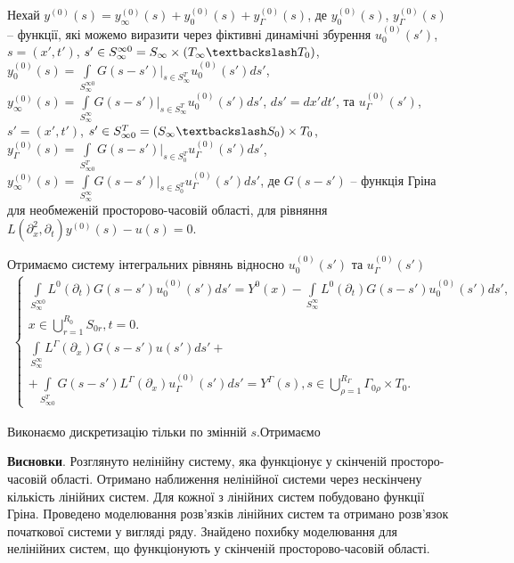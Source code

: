 Нехай $y^{(0)}(s) = y^{(0)}_{\infty}(s) + y^{(0)}_{0}(s) + y^{(0)}_{\Gamma}(s)$, де $y^{(0)}_{0}(s)$, $y^{(0)}_{\Gamma}(s)$ --
функції, які можемо виразити через фіктивні динамічні збурення
$u^{(0)}_{0}(s')$,
$s=(x', t')$,
$s'\in S_{\infty}^{\infty 0} = S_{\infty} \times (T_{\infty}\textbackslash T_{0})$,
$y_{0}^{(0)}(s)=\int\limits_{S_{\infty}^{\infty 0}}G(s-s')\bigg|_{s\in S_{\infty}^{T}}u_{0}^{(0)}(s')ds'$,
$y_{\infty}^{(0)}(s)=\int\limits_{S_{\infty}^{\infty}}G(s-s')\bigg|_{s\in S_{\infty}^{T}}u_{0}^{(0)}(s')ds'$,
$ds'=dx'dt'$,
та
$u^{(0)}_{\Gamma}(s')$, $s'=(x', t')$, $s'\in S^{T}_{\infty 0}=(S_{\infty} \textbackslash S_{0})\times T_{0}$,
$y^{(0)}_{\Gamma}(s) = \int\limits_{S^{T}_{\infty 0}}G(s-s')\bigg|_{s\in S^{T}_{0}}u^{(0)}_{\Gamma}(s')ds'$,
$y^{(0)}_{\infty}(s) = \int\limits_{S^{\infty}_{\infty}}G(s-s')\bigg|_{s\in S^{T}_{0}}u^{(0)}_{\Gamma}(s')ds'$,
де $G(s - s')$ -- функція Гріна для необмеженій просторово-часовій області, для рівняння $L(\partial_x^2, \partial_t)y^{(0)}(s) - u(s) = 0$.

Отримаємо систему інтегральних рівнянь відносно $u^{(0)}_{0}(s')$ та $u^{(0)}_{\Gamma}(s')$
\begin{gather*}
    \left\{
    \begin{alignedat}{2}
        \int\limits_{S_{\infty}^{\infty 0}}L^{0}(\partial_{t})G(s-s')u_{0}^{(0)}(s')ds' =
        Y^{0}(x)-\int\limits_{S_{\infty}^{\infty}} L^{0}(\partial_{t})G(s-s')u_{0}^{(0)}(s')ds',\\
        x\in\bigcup\limits_{r=1}^{R_{0}} S_{0r},t=0.\\
        \int\limits_{S^{\infty}_{\infty}}L^{\Gamma}(\partial_{x})G(s-s')u(s')ds' +\\
        + \int\limits_{S^{T}_{\infty 0}}G(s-s')L^{\Gamma}(\partial_{x})u^{(0)}_{\Gamma}(s')ds' = Y^{\Gamma}(s),
        s\in\bigcup\limits_{\rho=1}^{R_{\Gamma}} \Gamma_{0\rho}\times T_{0}.
    \end{alignedat}
    \right.
\end{gather*}



Виконаємо дискретизацію тільки по змінній $s$.Отримаємо











\textbf{Висновки}.
Розглянуто нелінійну систему, яка функціонує у скінченій просторо-часовій області.
Отримано наближення нелінійної системи через нескінчену кількість лінійних систем.
Для кожної з лінійних систем побудовано функції Гріна.
Проведено моделювання розв'язків лінійних систем та отримано розв'язок початкової системи у вигляді
ряду.
Знайдено похибку моделювання для нелінійних систем, що функціонують у скінченій просторово-часовій області.



